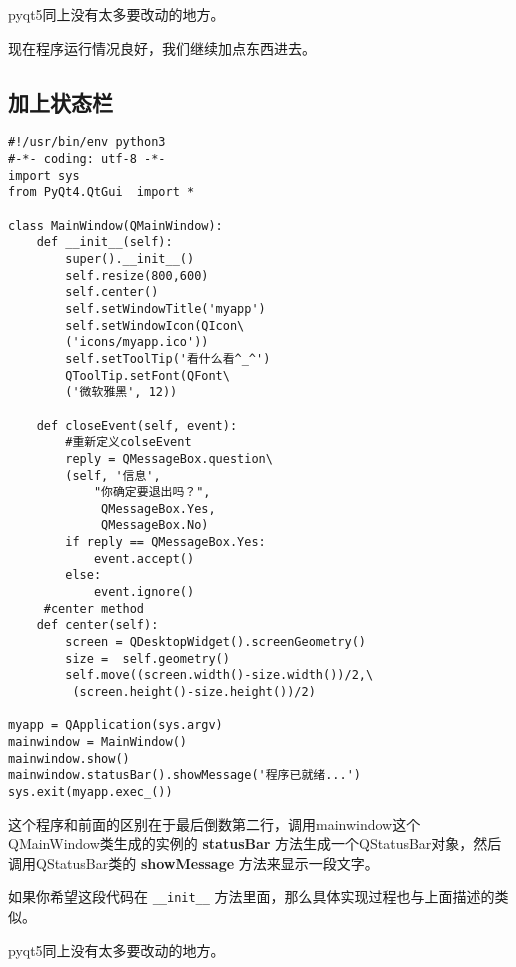 \documentclass[11pt,oneside]{article}
\begin{document}
pyqt5同上没有太多要改动的地方。

现在程序运行情况良好，我们继续加点东西进去。


\subsection{加上状态栏}
\label{sec:orgheadline11}
\begin{verbatim}
#!/usr/bin/env python3
#-*- coding: utf-8 -*-
import sys
from PyQt4.QtGui  import *

class MainWindow(QMainWindow):
    def __init__(self):
        super().__init__()
        self.resize(800,600)
        self.center()
        self.setWindowTitle('myapp')
        self.setWindowIcon(QIcon\
        ('icons/myapp.ico'))
        self.setToolTip('看什么看^_^')
        QToolTip.setFont(QFont\
        ('微软雅黑', 12))

    def closeEvent(self, event):
        #重新定义colseEvent
        reply = QMessageBox.question\
        (self, '信息',
            "你确定要退出吗？",
             QMessageBox.Yes,
             QMessageBox.No)
        if reply == QMessageBox.Yes:
            event.accept()
        else:
            event.ignore()
     #center method
    def center(self):
        screen = QDesktopWidget().screenGeometry()
        size =  self.geometry()
        self.move((screen.width()-size.width())/2,\
         (screen.height()-size.height())/2)

myapp = QApplication(sys.argv)
mainwindow = MainWindow()
mainwindow.show()
mainwindow.statusBar().showMessage('程序已就绪...')
sys.exit(myapp.exec_())
\end{verbatim}

这个程序和前面的区别在于最后倒数第二行，调用mainwindow这个QMainWindow类生成的实例的 \textbf{statusBar} 方法生成一个QStatusBar对象，然后调用QStatusBar类的 \textbf{showMessage} 方法来显示一段文字。

如果你希望这段代码在 \texttt{\_\_init\_\_} 方法里面，那么具体实现过程也与上面描述的类似。

pyqt5同上没有太多要改动的地方。
\end{document}
